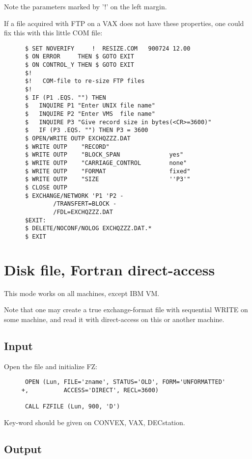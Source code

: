 Note the parameters marked by '!' on the left margin.

If a file acquired with FTP on a VAX does not have these properties,
one could fix this with this little COM file:

\begin{verbatim}
      $ SET NOVERIFY     !  RESIZE.COM   900724 12.00
      $ ON ERROR     THEN $ GOTO EXIT
      $ ON CONTROL_Y THEN $ GOTO EXIT
      $!
      $!   COM-file to re-size FTP files
      $!
      $ IF (P1 .EQS. "") THEN
      $   INQUIRE P1 "Enter UNIX file name"
      $   INQUIRE P2 "Enter VMS  file name"
      $   INQUIRE P3 "Give record size in bytes(<CR>=3600)"
      $   IF (P3 .EQS. "") THEN P3 = 3600
      $ OPEN/WRITE OUTP EXCHQZZZ.DAT
      $ WRITE OUTP    "RECORD"
      $ WRITE OUTP    "BLOCK_SPAN              yes"
      $ WRITE OUTP    "CARRIAGE_CONTROL        none"
      $ WRITE OUTP    "FORMAT                  fixed"
      $ WRITE OUTP    "SIZE                    ''P3'"
      $ CLOSE OUTP
      $ EXCHANGE/NETWORK 'P1 'P2 -
              /TRANSFERT=BLOCK -
              /FDL=EXCHQZZZ.DAT
      $EXIT:
      $ DELETE/NOCONF/NOLOG EXCHQZZZ.DAT.*
      $ EXIT
\end{verbatim}

\section{Disk file, Fortran direct-access}

This mode works on all machines, except IBM VM.

Note that one may create a true exchange-format file with
sequential WRITE on some machine, and read it with
direct-access on this or another machine.

\subsection*{Input}

Open the file and initialize FZ:

\begin{verbatim}
      OPEN (Lun, FILE='zname', STATUS='OLD', FORM='UNFORMATTED'
     +,          ACCESS='DIRECT', RECL=3600)

      CALL FZFILE (Lun, 900, 'D')
\end{verbatim}

Key-word  should be given on CONVEX, VAX, DECstation.

\subsection*{Output}

